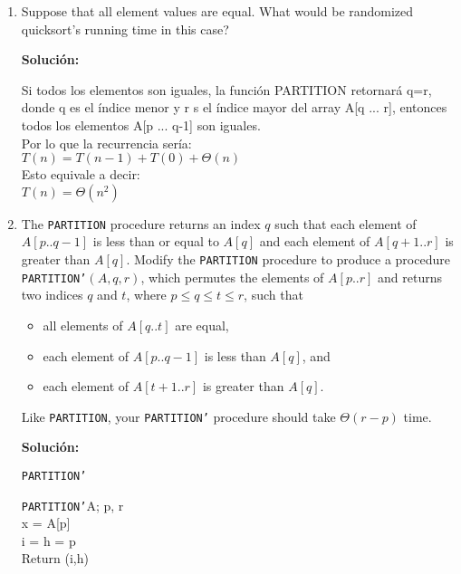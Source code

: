 \documentclass{article}
\begin{document}
\begin{enumerate}[label=(\alph*)]
  \item Suppose that all element values are equal. What would be randomized quicksort's running time in this case?
  
  \textbf{Solución:}
  
  Si todos los elementos son iguales, la función PARTITION retornará q=r, donde q es el índice menor y r s el índice mayor del array A[q ... r], entonces todos los elementos A[p ... q-1] son iguales.\\
  Por lo que la recurrencia sería:\\
  $T(n) = T(n-1) + T(0) + \Theta (n)$\\
  Esto equivale a decir:\\
  $T(n) = \Theta (n^2)$
  
  \item The \texttt{PARTITION} procedure returns an index $q$ such that each 
  element of $A[p..q-1]$ is less than or equal to $A[q]$ and each element of
  $A[q+1..r]$  is greater than $A[q]$. Modify the \texttt{PARTITION} procedure
  to produce a procedure \texttt{PARTITION'}$(A,q,r)$, which permutes the 
  elements of $A[p..r]$ and returns two indices $q$ and $t$,  where $p \leq q \leq t \leq r$, such that
  \begin{itemize}
    \item all elements of $A[q..t]$ are equal,
    \item each element of $A[p..q-1]$ is less than $A[q]$, and
    \item each element of $A[t+1..r]$ is greater than $A[q]$.
  \end{itemize}
  Like \texttt{PARTITION}, your \texttt{PARTITION'} procedure should take $\Theta(r-p)$ time.
  
  \textbf{Solución:}
  
  \begin{algorithm}[H]
   \caption{\texttt{PARTITION'}}
   \texttt{PARTITION'}A; p, r\\
   x = A[p]\\
   i = h = p\\
   Return (i,h)
  \end{algorithm}
  

\end{enumerate}
\end{document}
